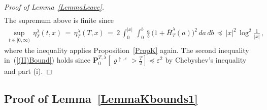 \documentclass[10pt]{article}
\numberwithin{equation}{section}
\theoremstyle{definition}
\begin{document}
\begin{proof}[Proof of Lemma~\ref{LemmaLeave}]
\begin{align}
\end{align}
The supremum above is finite since
\begin{align*}
    \sup_{t\in [0,\infty)}\,\eta_{T}^{\lambda}(t,x)\,= \, \eta_{T}^{\lambda}(T,x)  \,= \, 2\,\int_0^{|x|} \, \int_0^b\, \frac{a}{b} \,\big( 1+\bar{H}_{T}^{\lambda}(a)\big)^2  \,   da\, db\,\preceq \,|x|^2\,\log^2\frac{1}{|x|} \,,
\end{align*}
where the  inequality applies Proposition~\ref{PropK} again. The second inequality in~(\ref{(II)Bound}) holds since $\mathbf{P}_{0}^{T,\lambda}[ \varrho^{\uparrow, \varepsilon} > \frac{T}{2}   ]\preceq \varepsilon^2$ by   Chebyshev's inequality and part (i).
\end{proof}



\subsection{Proof of Lemma~\ref{LemmaKbounds1} } \label{SubsectionLemmaKbounds1}
\end{document}
